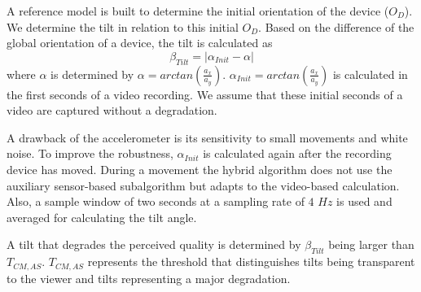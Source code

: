 A reference model is built to determine the initial orientation of the device ($O_D$). 
We determine the tilt in relation to this initial $O_D$.
Based on the difference of the global orientation of a device, the tilt is calculated as
\begin{equation}
\beta_{Tilt} = 
|\alpha_{Init} - \alpha|
\end{equation} 
where $\alpha$ is determined by $\alpha = arctan(\frac{a_x}{a_y})$.
$\alpha_{Init} = arctan(\frac{a_x}{a_y})$ is calculated in the first seconds of a video recording. 
We assume that these initial seconds of a video are captured without a degradation. 

A drawback of the accelerometer is its sensitivity to small movements and white noise. 
To improve the robustness, $\alpha_{Init}$ is calculated again after the recording device has moved. 
During a movement the hybrid algorithm does not use the auxiliary sensor-based subalgorithm but adapts to the video-based calculation.  
Also, a sample window of two seconds at a sampling rate of $4$ $\unit{Hz}$ is used and averaged for calculating the tilt angle.

A tilt that degrades the perceived quality is determined by $\beta_{Tilt}$ being larger than $T_{CM,AS}$.
$T_{CM,AS}$ represents the threshold that distinguishes tilts being transparent to the viewer and tilts representing a major degradation.
